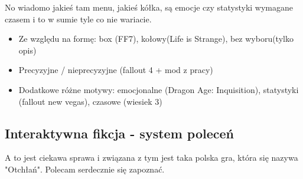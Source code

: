 No wiadomo jakieś tam menu, jakieś kółka, są emocje czy statystyki wymagane czasem i to w sumie
tyle co nie wariacie.

\begin{itemize}
	\item Ze względu na formę: box (FF7), kołowy(Life is Strange), bez wyboru(tylko opis)
	\item Precyzyjne / nieprecyzyjne (fallout 4 + mod z pracy)
	\item Dodatkowe różne motywy: emocjonalne (Dragon Age: Inquisition), statystyki (fallout new vegas), czasowe (wiesiek 3)
\end{itemize}

\subsection{Interaktywna fikcja - system poleceń}\label{subsection:ch1_3_2}

A to jest ciekawa sprawa i związana z tym jest taka polska gra, która się nazywa "Otchłań".
Polecam serdecznie się zapoznać.